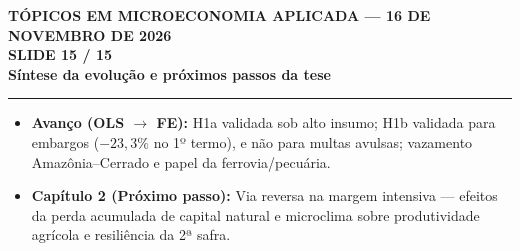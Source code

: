 \documentclass[11pt,a4paper]{article}
\newcommand{\slidenum}{1}
\begin{document}
\newpage

\renewcommand{\slidenum}{15}
\noindent
\begin{minipage}{\textwidth}
\begin{center}
{\color{cinza}\footnotesize\textbf{TÓPICOS EM MICROECONOMIA APLICADA --- 16 DE NOVEMBRO DE 2026}\\[1.2mm]}
{\color{cinza}\bfseries\Large SLIDE 15 / 15\\[1.5mm]}
{\color{verde}\bfseries\LARGE Síntese da evolução e próximos passos da tese\\[2.5mm]}
\rule{\textwidth}{1pt}
\end{center}
\end{minipage}
\vspace{1.5mm}

\begin{tcolorbox}[title={\bfseries\small ÂNCORAS EMPÍRICAS E CONCEITUAIS DO SLIDE}]
\begin{itemize}[leftmargin=*,itemsep=1mm,topsep=0.5mm]
    \item \textbf{Avanço (OLS $\rightarrow$ FE):} H1a validada sob alto insumo; H1b validada para embargos ($-23{,}3\%$ no 1º termo), e não para multas avulsas; vazamento Amazônia--Cerrado e papel da ferrovia/pecuária.
    \item \textbf{Capítulo 2 (Próximo passo):} Via reversa na margem intensiva — efeitos da perda acumulada de capital natural e microclima sobre produtividade agrícola e resiliência da 2ª safra.
\end{itemize}
\end{tcolorbox}
\vspace{2mm}
\end{document}
